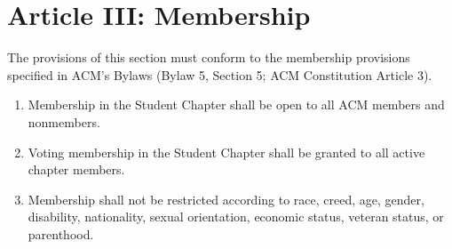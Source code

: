 \section*{Article III: Membership}

The provisions of this section must conform to the membership provisions specified in ACM's Bylaws (Bylaw 5, Section 5; ACM Constitution Article 3).

\begin{enumerate}
    \item Membership in the Student Chapter shall be open to all ACM members and nonmembers.
    \item Voting membership in the Student Chapter shall be granted to all active chapter members.
    \item Membership shall not be restricted according to race, creed, age, gender, disability, nationality, sexual orientation, economic status, veteran status, or parenthood.
\end{enumerate}
